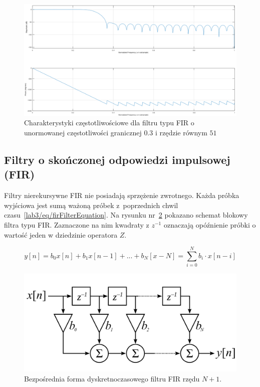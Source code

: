 \begin{figure}[hbt!]
	\centering
	\includegraphics[width=0.9\linewidth]{images/freqzFunction.png}
	\caption{Charakterystyki częstotliwościowe dla filtru typu FIR o unormowanej częstotliwości granicznej $0.3$ i rzędzie równym $51$}
	\label{lab3/fig/freqzFunction}
\end{figure}

\subsection{Filtry o skończonej odpowiedzi impulsowej (FIR)}
Filtry nierekursywne FIR nie posiadają sprzężenie zwrotnego. Każda próbka wyjściowa jest sumą ważoną próbek z~poprzednich chwil czasu~\ref{lab3/eq/firFilterEquation}. Na rysunku nr~\ref{lab3/fig/firFilterDirectForm} pokazano schemat blokowy filtra typu FIR. Zaznaczone na nim kwadraty z $z^{-1}$ oznaczają opóźnienie próbki o wartość jeden w dziedzinie operatora $Z$.

\begin{equation}\label{lab3/eq/firFilterEquation}
	y[n] = b_0 x[n] + b_1 x[n-1] + ... + b_N[x-N] = \sum_{i=0}^{N}b_i\cdot x[n-i]
\end{equation}

\begin{figure}[hbt!]
	\centering
	\includegraphics[width=0.7\linewidth]{images/firFilterDirectForm.png}
	\caption{Bezpośrednia forma dyskretnoczasowego filtru FIR rzędu $N+1$.}
	\label{lab3/fig/firFilterDirectForm}
\end{figure}

